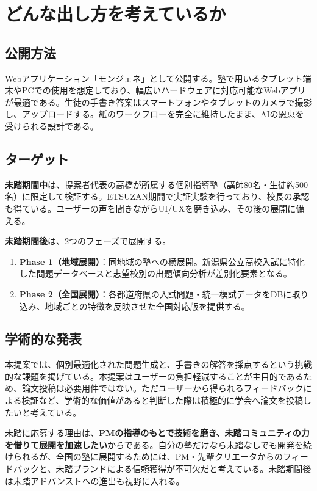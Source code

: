 \documentclass[paper=a4,fontsize=10.5bp,jafontsize=10.5bp,twocolumn]{jlreq}
\begin{document}
\section{どんな出し方を考えているか}

\subsection{公開方法}

Webアプリケーション「モンジェネ」として公開する。塾で用いるタブレット端末やPCでの使用を想定しており、幅広いハードウェアに対応可能なWebアプリが最適である。生徒の手書き答案はスマートフォンやタブレットのカメラで撮影し、アップロードする。紙のワークフローを完全に維持したまま、AIの恩恵を受けられる設計である。

\subsection{ターゲット}

\textbf{未踏期間中}は、提案者代表の高橋が所属する個別指導塾（講師80名・生徒約500名）に限定して検証する。ETSUZAN期間で実証実験を行っており、校長の承認も得ている。ユーザーの声を聞きながらUI/UXを磨き込み、その後の展開に備える。

\textbf{未踏期間後}は、2つのフェーズで展開する。

\begin{enumerate}[leftmargin=2em]
  \item \textbf{Phase 1（地域展開）}：同地域の塾への横展開。新潟県公立高校入試に特化した問題データベースと志望校別の出題傾向分析が差別化要素となる。
  \item \textbf{Phase 2（全国展開）}：各都道府県の入試問題・統一模試データをDBに取り込み、地域ごとの特徴を反映させた全国対応版を提供する。
\end{enumerate}

\subsection{学術的な発表}

本提案では、個別最適化された問題生成と、手書きの解答を採点するという挑戦的な課題を掲げている。本提案はユーザーの負担軽減することが主目的であるため、論文投稿は必要用件ではない。ただユーザーから得られるフィードバックによる検証など、学術的な価値があると判断した際は積極的に学会へ論文を投稿したいと考えている。

未踏に応募する理由は、\textbf{PMの指導のもとで技術を磨き、未踏コミュニティの力を借りて展開を加速したい}からである。自分の塾だけなら未踏なしでも開発を続けられるが、全国の塾に展開するためには、PM・先輩クリエータからのフィードバックと、未踏ブランドによる信頼獲得が不可欠だと考えている。未踏期間後は未踏アドバンストへの進出も視野に入れる。
\end{document}
